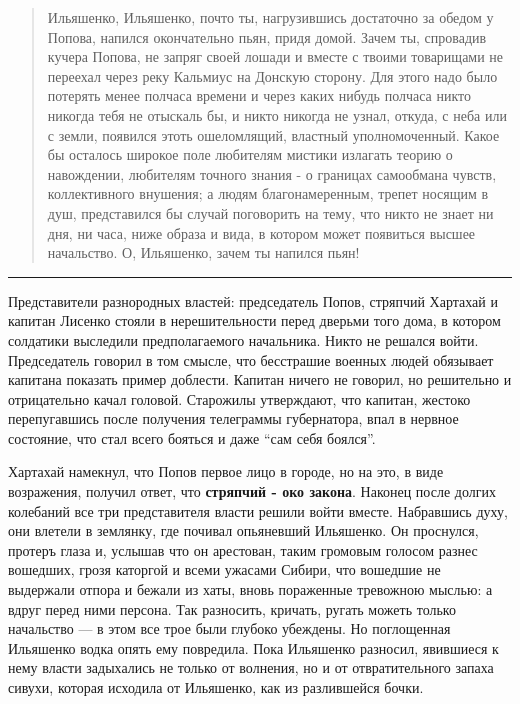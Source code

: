 \documentclass[a4paper,20pt]{article}
\begin{document}
\begin{quote}
\em\bfseries
	
Ильяшенко, Ильяшенко, почто ты, нагрузившись достаточно за обедом у Попова,
напился окончательно пьян, придя домой. Зачем ты, спровадив кучера Попова, не
запряг своей лошади и вместе с твоими товарищами не переехал через реку
Кальмиус на Донскую сторону. Для этого надо было потерять менее полчаса времени
и через каких нибудь полчаса никто никогда тебя не отыскаль бы, и никто никогда
не узнал, откуда, с неба или с земли, появился этоть ошеломлящий, властный
уполномоченный. Какое бы осталось широкое поле любителям мистики излагать
теорию о навождении, любителям точного знания - о границах самообмана чувств,
коллективного внушения; а людям благонамеренным, трепет носящим в душ,
представился бы случай поговорить на тему, что никто не знает ни дня, ни часа,
ниже образа и вида, в котором может появиться высшее начальство. О, Ильяшенко,
зачем ты напился пьян!

\end{quote}

\par\noindent\rule{\textwidth}{0.4pt}

Представители разнородных властей: председатель Попов, стряпчий Хартахай и
капитан Лисенко стояли в нерешительности перед дверьми того дома, в котором
солдатики выследили предполагаемого начальника. Никто не решался войти.
Председатель говорил в том смысле, что бесстрашие военных людей обязывает
капитана показать пример доблести. Капитан ничего не говорил, но решительно и
отрицательно качал головой. Старожилы утверждают, что капитан, жестоко
перепугавшись после получения телеграммы губернатора, впал в нервное состояние,
что стал всего бояться и даже ``сам себя боялся''.

Хартахай намекнул, что Попов первое лицо в городе,
но на это, в виде возражения, получил ответ, что \textbf{стряпчий - око закона}.
Наконец после долгих колебаний все три представителя власти решили войти вместе.
Набравшись духу, они влетели в землянку, где почивал опьяневший Ильяшенко.
Он проснулся, протеръ глаза и, услышав что он
арестован, таким громовым голосом разнес вошедших,
грозя каторгой и всеми ужасами Сибири, что вошедшие не
выдержали отпора и бежали из хаты, вновь пораженные
тревожною мыслью: а вдруг перед ними персона. Так
разносить, кричать, ругать можеть только начальство — в
этом все трое были глубоко убеждены. Но поглощенная
Ильяшенко водка опять ему повредила. Пока Ильяшенко
разносил, явившиеся к нему власти задыхались не только
от волнения, но и от отвратительного запаха сивухи, которая 
исходила от Ильяшенко, как из разлившейся бочки.
\end{document}
